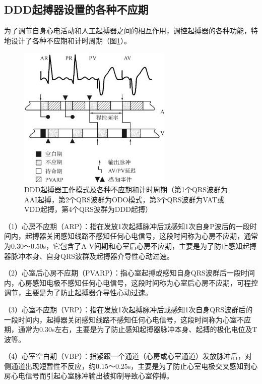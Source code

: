 \protect\hypertarget{text00045.htmlux5cux23subid497}{}{}

\subsection{DDD起搏器设置的各种不应期}

为了调节自身心电活动和人工起搏器之间的相互作用，调控起搏器的各种功能，特地设计了各种不应期和计时周期（图\ref{fig38-32}）。

\begin{figure}[!htbp]
 \centering
 \includegraphics[width=2.89583in,height=2.67708in]{./images/Image00635.jpg}
 \captionsetup{justification=centering}
 \caption{DDD起搏器工作模式及各种不应期和计时周期（第1个QRS波群为AAI起搏，第2个QRS波群为ODO模式，第3个QRS波群为VAT或VDD起搏，第4个QRS波群为DDD起搏）}
 \label{fig38-32}
  \end{figure} 

（1）心房不应期（ARP）：指在发放1次起搏脉冲后或感知1次自身P波后的一段时间内，起搏器关闭感知线路不感知任何心电信号，这段时间称为心房不应期，通常为0.30～0.50s，它包含了A-V间期和心室后心房不应期，主要是为了防止感知起搏器脉冲本身、自身QRS波群及起搏器介导性心动过速。

（2）心室后心房不应期（PVARP）：指心室起搏或感知自身QRS波群后一段时间内，心房感知电极不感知任何心电信号，这段时间称为心室后心房不应期，可程控调节，主要是为了防止起搏器介导性心动过速。

（3）心室不应期（VRP）：指在发放1次起搏脉冲后或感知1次自身QRS波群后的一段时间内，起搏器关闭感知线路不感知任何心电信号，这段时间称为心室不应期，通常为0.30s左右，主要是为了防止感知起搏器脉冲本身、起搏的极化电位及T波等。

（4）心室空白期（VBP）：指紧跟一个通道（心房或心室通道）发放脉冲后，对侧通道出现短暂性不反应，约0.15～0.25s，主要是为了防止心室电极交叉感知到心房心电信号而引起心室脉冲输出被抑制导致心室停搏。


